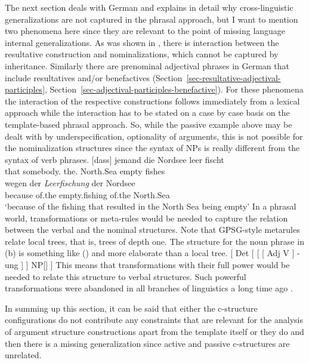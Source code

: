 The next section deals with German and explains in detail why cross-linguistic generalizations are not
captured in the phrasal approach, but I want to mention two phenomena here since they are relevant
to the point of missing language internal generalizations. As was shown in , there is interaction between the resultative construction and nominalizations, which
cannot be captured by inheritance. Similarly there are prenominal adjectival phrases in German that
include resultatives and/or benefactives (Section~\ref{sec-resultative-adjectival-participles},
Section~\ref{sec-adjectival-participles-benefactive}). For these phenomena the interaction of the
respective constructions follows immediately from a lexical approach while the interaction has to be stated on a case by case basis
on the template-based phrasal approach. So, while the passive example above may be dealt with by
underspecification, \eg optionality of arguments, this is not possible for the nominalization
structures since the syntax of NPs is really different from the syntax of verb phrases. 
\eal
\ex 
\gll {}[dass] jemand die Nordsee leer fischt\\
	 {}\spacebr{}that somebody.\nom{} the.\acc{} North.Sea empty fishes\\
\ex\label{bsp-leerfischung}
\gll wegen   der \emph{Leerfischung}  der    Nordsee\footnotemark\\
     because of.the empty.fishing of.the North.Sea\\
\glt `because of the fishing that resulted in the North Sea being empty'
\zl
In a phrasal world, transformations or meta-rules would be needed to capture the relation between the verbal and
the nominal structures. Note that GPSG-style metarules relate local trees, that is, trees of depth
one. The structure for the noun phrase in (b) is something like () and more elaborate
than a local tree. 
\ea
{}[ Det [ [ [ Adj V ] -ung ] ] NP[] ]
\z
This means that
transformations with their full power would be needed to relate this structure to verbal
structures. Such powerful transformations were abandoned in all branches of linguistics a long
time ago \citep{Chomsky81a}.



In summing up this section, it can be said that either the c-structure configurations do not
contribute any constraints that are relevant for the analysis of argument structure constructions
apart from the  template itself or they do and then there is a missing
generalization since active and passive c-structures are unrelated.

